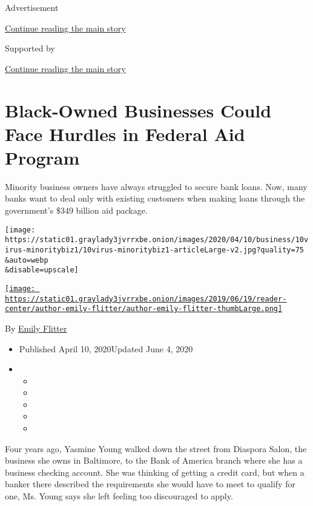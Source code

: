 Advertisement

\protect\hyperlink{after-top}{Continue reading the main story}

Supported by

\protect\hyperlink{after-sponsor}{Continue reading the main story}

\hypertarget{black-owned-businesses-could-face-hurdles-in-federal-aid-program}{%
\section{Black-Owned Businesses Could Face Hurdles in Federal Aid
Program}\label{black-owned-businesses-could-face-hurdles-in-federal-aid-program}}

Minority business owners have always struggled to secure bank loans.
Now, many banks want to deal only with existing customers when making
loans through the government's \$349 billion aid package.

\texttt{[image: https://static01.graylady3jvrrxbe.onion/images/2020/04/10/business/10virus-minoritybiz1/10virus-minoritybiz1-articleLarge-v2.jpg?quality=75\\\&auto=webp\\\&disable=upscale]}

\href{https://www.nytimes3xbfgragh.onion/by/emily-flitter}{\texttt{[image: https://static01.graylady3jvrrxbe.onion/images/2019/06/19/reader-center/author-emily-flitter/author-emily-flitter-thumbLarge.png]}}

By \href{https://www.nytimes3xbfgragh.onion/by/emily-flitter}{Emily
Flitter}

\begin{itemize}
\item
  Published April 10, 2020Updated June 4, 2020
\item
  \begin{itemize}
  \item
  \item
  \item
  \item
  \item
  \end{itemize}
\end{itemize}

Four years ago, Yasmine Young walked down the street from Diaspora
Salon, the business she owns in Baltimore, to the Bank of America branch
where she has a business checking account. She was thinking of getting a
credit card, but when a banker there described the requirements she
would have to meet to qualify for one, Ms. Young says she left feeling
too discouraged to apply.

